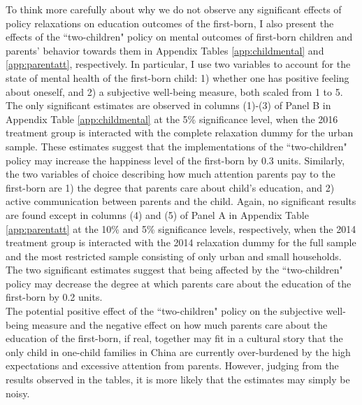 \documentclass[12pt]{extarticle}
\begin{document}
\indent To think more carefully about why we do not observe any significant effects of policy relaxations on education outcomes of the first-born, I also present the effects of the ``two-children" policy on mental outcomes of first-born children and parents' behavior towards them in Appendix Tables \ref{app:childmental} and \ref{app:parentatt}, respectively. In particular, I use two variables to account for the state of mental health of the first-born child: 1) whether one has positive feeling about oneself, and 2) a subjective well-being measure, both scaled from 1 to 5. The only significant estimates are observed in columns (1)-(3) of Panel B in Appendix Table \ref{app:childmental} at the 5\% significance level, when the 2016 treatment group is interacted with the complete relaxation dummy for the urban sample. These estimates suggest that the implementations of the ``two-children" policy may increase the happiness level of the first-born by 0.3 units. Similarly, the two variables of choice describing how much attention parents pay to the first-born are 1) the degree that parents care about child's education, and 2) active communication between parents and the child. Again, no significant results are found except in columns (4) and (5) of Panel A in Appendix Table \ref{app:parentatt} at the 10\% and 5\% significance levels, respectively, when the 2014 treatment group is interacted with the 2014 relaxation dummy for the full sample and the most restricted sample consisting of only urban and small households. The two significant estimates suggest that being affected by the ``two-children" policy may decrease the degree at which parents care about the education of the first-born by 0.2 units. \\
\indent The potential positive effect of the ``two-children" policy on the subjective well-being measure and the negative effect on how much parents care about the education of the first-born, if real, together may fit in a cultural story that the only child in one-child families in China are currently over-burdened by the high expectations and excessive attention from parents. However, judging from the results observed in the tables, it is more likely that the estimates may simply be noisy.
\end{document}
